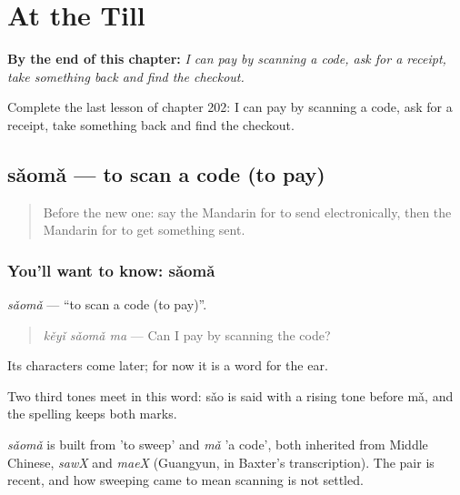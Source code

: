 
\chapter{At the Till}
\label{ch:zh-at-the-till}

\begin{chapteropening}
\textbf{By the end of this chapter:} \emph{I can pay by scanning a code, ask for a receipt, take something back and find the checkout.}

Complete the last lesson of chapter 202: I can pay by scanning a code, ask for a receipt, take something back and find the checkout.
\end{chapteropening}

\section[sǎomǎ]{sǎomǎ — to scan a code (to pay)}

\label{lesson:ZH-C202-saoma}



\begin{quote}
Before the new one: say the Mandarin for to send electronically, then the Mandarin for to get something sent.
\end{quote}

\subsection*{You'll want to know: sǎomǎ}
\emph{sǎomǎ} — \textquotedblleft{}to scan a code (to pay)\textquotedblright{}.

\begin{quote}
\emph{kěyǐ sǎomǎ ma} — Can I pay by scanning the code?
\end{quote}

Its characters come later; for now it is a word for the ear.

Two third tones meet in this word: sǎo is said with a rising tone before mǎ, and the spelling keeps both marks.

\begin{cousinweb}
\emph{sǎomǎ} is built from  'to sweep' and \emph{mǎ} 'a code', both inherited from Middle Chinese, \emph{sawX} and \emph{maeX} (Guangyun, in Baxter's transcription). The pair is recent, and how sweeping came to mean scanning is not settled.
\end{cousinweb}

